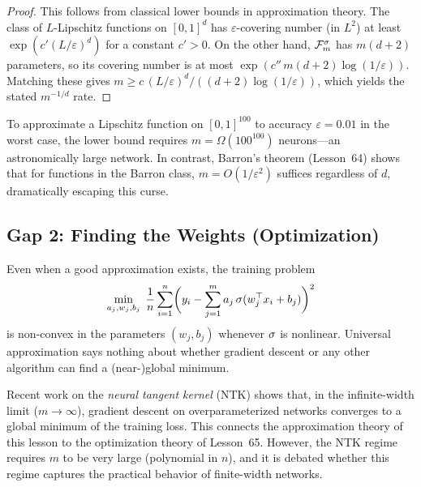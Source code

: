 \documentclass[11pt,a4paper]{article}
\begin{document}
\begin{proof}
This follows from classical lower bounds in approximation theory.  The
class of $L$-Lipschitz functions on $[0,1]^d$ has
$\varepsilon$-covering number (in $L^2$) at least
$\exp(c' (L/\varepsilon)^d)$ for a constant $c' > 0$.  On the other
hand, $\mathcal{F}_m^{\sigma}$ has $m(d+2)$ parameters, so its covering
number is at most $\exp(c'' \, m(d+2) \log(1/\varepsilon))$.  Matching
these gives $m \ge c \, (L/\varepsilon)^d / ((d+2) \log(1/\varepsilon))$,
which yields the stated $m^{-1/d}$ rate.
\end{proof}

\begin{example}
\label{ex:dimension-scaling}
To approximate a Lipschitz function on $[0,1]^{100}$ to accuracy
$\varepsilon = 0.01$ in the worst case, the lower bound requires
$m = \Omega(100^{100})$ neurons---an astronomically large network.
In contrast, Barron's theorem (Lesson~64) shows that for functions in
the Barron class, $m = O(1/\varepsilon^2)$ suffices regardless of $d$,
dramatically escaping this curse.
\end{example}

\subsection{Gap 2: Finding the Weights (Optimization)}
\label{sec:optimization-gap}

Even when a good approximation exists, the training problem
\[
  \min_{a_j, w_j, b_j} \;
  \frac{1}{n} \sum_{i=1}^{n}
  \biggl( y_i - \sum_{j=1}^{m} a_j \, \sigma(w_j^\top x_i + b_j)
  \biggr)^2
\]
is non-convex in the parameters $(w_j, b_j)$ whenever $\sigma$ is
nonlinear.  Universal approximation says nothing about whether gradient
descent or any other algorithm can find a (near-)global minimum.

\begin{remark}
\label{rem:ntk}
Recent work on the \emph{neural tangent kernel} (NTK)
\citep{jacot2018} shows that, in the infinite-width limit ($m \to \infty$),
gradient descent on overparameterized networks converges to a global minimum
of the training loss.  This connects the approximation theory of this lesson
to the optimization theory of Lesson~65.  However, the NTK regime requires
$m$ to be very large (polynomial in $n$), and it is debated whether this
regime captures the practical behavior of finite-width networks.
\end{remark}
\end{document}
